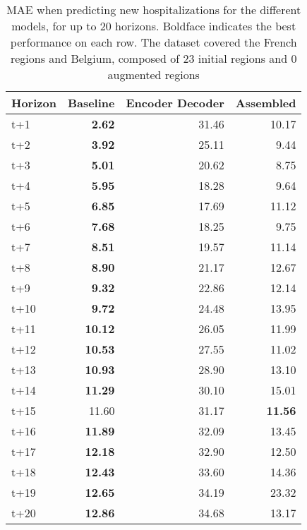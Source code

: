 \begin{table}[H]
\centering
\caption{MAE when predicting new hospitalizations for the different models, for up to 20 horizons. Boldface indicates the best performance on each row. The dataset covered the French regions and Belgium, composed of 23 initial regions and 0 augmented regions }
\label{tab:MAE_comparison}
\begin{tabular}{lrrr}
\toprule
Horizon &  Baseline &  Encoder Decoder &  Assembled \\
\midrule
t+1  & \textbf{2.62}  & 31.46  & 10.17  \\
t+2  & \textbf{3.92}  & 25.11  & 9.44  \\
t+3  & \textbf{5.01}  & 20.62  & 8.75  \\
t+4  & \textbf{5.95}  & 18.28  & 9.64  \\
t+5  & \textbf{6.85}  & 17.69  & 11.12  \\
t+6  & \textbf{7.68}  & 18.25  & 9.75  \\
t+7  & \textbf{8.51}  & 19.57  & 11.14  \\
t+8  & \textbf{8.90}  & 21.17  & 12.67  \\
t+9  & \textbf{9.32}  & 22.86  & 12.14  \\
t+10  & \textbf{9.72}  & 24.48  & 13.95  \\
t+11  & \textbf{10.12}  & 26.05  & 11.99  \\
t+12  & \textbf{10.53}  & 27.55  & 11.02  \\
t+13  & \textbf{10.93}  & 28.90  & 13.10  \\
t+14  & \textbf{11.29}  & 30.10  & 15.01  \\
t+15  & 11.60  & 31.17  & \textbf{11.56}  \\
t+16  & \textbf{11.89}  & 32.09  & 13.45  \\
t+17  & \textbf{12.18}  & 32.90  & 12.50  \\
t+18  & \textbf{12.43}  & 33.60  & 14.36  \\
t+19  & \textbf{12.65}  & 34.19  & 23.32  \\
t+20  & \textbf{12.86}  & 34.68  & 13.17  \\

\bottomrule
\end{tabular}
\end{table}
